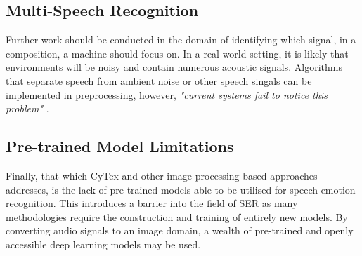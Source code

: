 \subsection{Multi-Speech Recognition}
Further work should be conducted in the domain of identifying which signal, in a composition, a machine should focus on. In a real-world setting, it is likely that environments will be noisy and contain numerous acoustic signals. Algorithms that separate speech from ambient noise or other speech singals can be implemented in preprocessing, however, \textit{"current systems fail to notice this problem"} \cite{surveyCORE1}.
 
\subsection{Pre-trained Model Limitations}
Finally, that which CyTex and other image processing based approaches addresses, is the lack of pre-trained models able to be utilised for speech emotion recognition. This introduces a barrier into the field of SER as many methodologies require the construction and training of entirely new models. By converting audio signals to an image domain, a wealth of pre-trained and openly accessible deep learning models may be used.
